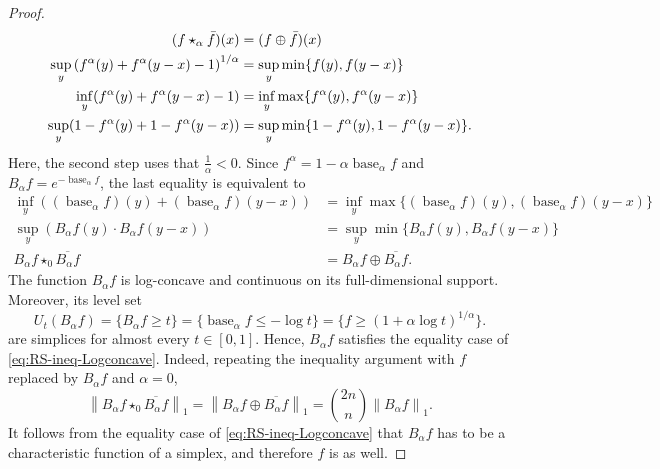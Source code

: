 \documentclass[11pt]{amsart}
\theoremstyle{plain}
\theoremstyle{definition}
\theoremstyle{remark}
\begin{document}
\begin{proof}
    \begin{align}
        (f \star_{\alpha} \Bar{f} )(x)  &= (f \oplus \Bar{f} )(x) \label{eq:pt-Karamata-alpha}
        \\
        \sup_y \left(f^\alpha (y)+ f^\alpha (y-x) -1 \right)^{1/\alpha} &= \sup_y \min \{f (y), f (y-x) \}
        \\
        \inf_y (f^\alpha (y)+ f^\alpha (y-x) -1 )&= \inf_y \max \{f^\alpha (y), f^\alpha (y-x) \}
        \\
        \sup_y (1- f^\alpha (y)+ 1- f^\alpha (y-x))  &= \sup_y \min \{1- f^\alpha (y), 1- f^\alpha (y-x) \}.
    \end{align}
    Here, the second step uses that $\frac{1}{\alpha} < 0$. Since $f^\alpha = 1-\alpha \operatorname{base}_\alpha f$ and $B_\alpha f = e^{- \operatorname{base}_\alpha f}$, the last equality is equivalent to
    \begin{align}
        \inf_y \left((\operatorname{base}_\alpha f) (y) + (\operatorname{base}_\alpha f) (y-x) \right) &= \inf_y \max \{(\operatorname{base}_\alpha f) (y) ,(\operatorname{base}_\alpha f) (y-x)  \}
        \\
        \sup_y \left(B_\alpha f(y) \cdot  B_\alpha f(y-x) \right) &= \sup_y \min \{ B_\alpha f(y), B_\alpha f(y-x) \}
        \\
        B_\alpha f \star_{0} \overline{B_\alpha f}  &= B_\alpha f  \oplus \overline{B_\alpha f} .
    \end{align}
    The function $B_\alpha f$ is log-concave and continuous on its full-dimensional support. Moreover, its level set
    $$
        U_{t} \left( B_\alpha f\right) = \{ B_\alpha f \geq t\} = \{  \operatorname{base}_\alpha f\leq -\log t\} =\{ f\geq (1+\alpha \log t)^{1 / \alpha}
        \}.
    $$
    are simplices for almost every $t \in [0,1]$. Hence, $B_\alpha f$ satisfies the equality case of \eqref{eq:RS-ineq-Logconcave}. Indeed, repeating the inequality argument with $f$ replaced by $B_\alpha f$ and $\alpha = 0$,
    \[
        \left\|B_\alpha f \star_0 \overline{B_\alpha f}\right\|_1=\left\|B_\alpha f \oplus \overline{B_\alpha f}\right\|_1=\binom{2 n}{n}\left\|B_\alpha f\right\|_1.
    \]
    It follows from the equality case of \eqref{eq:RS-ineq-Logconcave} that $B_\alpha f$ has to be a characteristic function of a simplex, and therefore $f$ is as well.


\end{proof}
\end{document}
